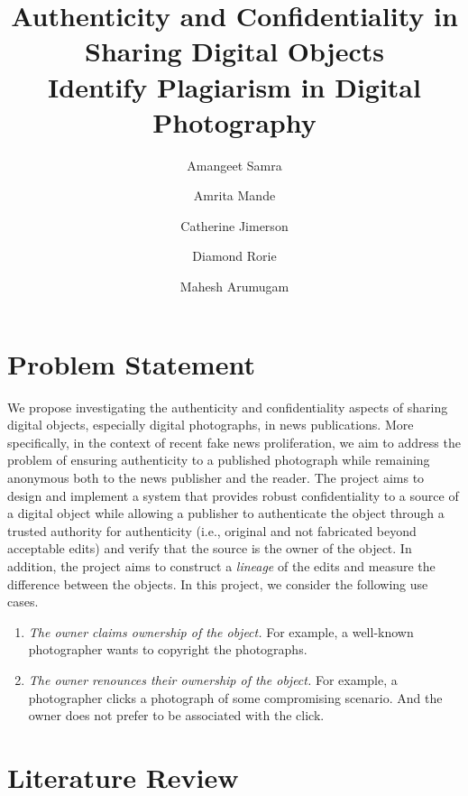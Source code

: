 \documentclass[10pt]{article}
\begin{document}
\title{Authenticity and Confidentiality in Sharing Digital Objects\\
\large Identify Plagiarism in Digital Photography}

\author{Amangeet Samra}
\author{Amrita Mande}
\author{Catherine Jimerson}
\author{Diamond Rorie}
\author{Mahesh Arumugam}

\maketitle
\thispagestyle{firstpage}   

\section{Problem Statement}
\label{sec:stmt}

We propose investigating the authenticity and confidentiality aspects of sharing digital objects, especially digital photographs, in news publications. More specifically, in the context of recent fake news proliferation, we aim to address the problem of ensuring authenticity to a published photograph while remaining anonymous both to the news publisher and the reader. The project aims to design and implement a system that provides robust confidentiality to a source of a digital object while allowing a publisher to authenticate the object through a trusted authority for authenticity (i.e., original and not fabricated beyond acceptable edits) and verify that the source is the owner of the object. In addition, the project aims to construct a {\em lineage} of the edits and measure the difference between the objects. In this project, we consider the following use cases.

\begin{enumerate}
\item {\em The owner claims ownership of the object.} For example, a well-known photographer wants to copyright the photographs.
\item {\em The owner renounces their ownership of the object.} For example, a photographer clicks a photograph of some compromising scenario. And the owner does not prefer to be associated with the click. 
\end{enumerate}

\section{Literature Review}
\end{document}
